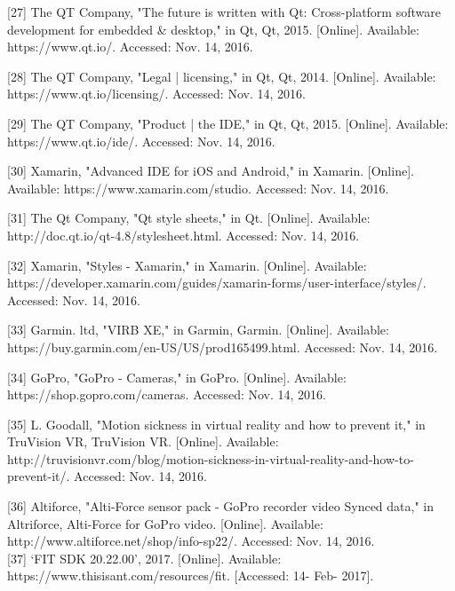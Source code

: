 \documentclass[10pt,draftclsnofoot,onecolumn]{IEEEtran}
\begin{document}
[27] The QT Company, "The future is written with Qt: Cross-platform software development for embedded & desktop," in Qt, Qt, 2015. [Online]. Available: https://www.qt.io/. Accessed: Nov. 14, 2016.\\
 \vspace{2mm}


[28] The QT Company, "Legal | licensing," in Qt, Qt, 2014. [Online]. Available: https://www.qt.io/licensing/. Accessed: Nov. 14, 2016.\\
 \vspace{2mm}


[29] The QT Company, "Product | the IDE," in Qt, Qt, 2015. [Online]. Available: https://www.qt.io/ide/. Accessed: Nov. 14, 2016.\\
 \vspace{2mm}


[30] Xamarin, "Advanced IDE for iOS and Android," in Xamarin. [Online]. Available: https://www.xamarin.com/studio. Accessed: Nov. 14, 2016.\\
 \vspace{2mm}


[31] The Qt Company, "Qt style sheets," in Qt. [Online]. Available: http://doc.qt.io/qt-4.8/stylesheet.html. Accessed: Nov. 14, 2016.\\
 \vspace{2mm}


[32] Xamarin, "Styles - Xamarin," in Xamarin. [Online]. Available: https://developer.xamarin.com/guides/xamarin-forms/user-interface/styles/. Accessed: Nov. 14, 2016.\\
 \vspace{2mm}


[33] Garmin. ltd, "VIRB XE," in Garmin, Garmin. [Online]. Available: https://buy.garmin.com/en-US/US/prod165499.html. Accessed: Nov. 14, 2016.\\
 \vspace{2mm}


[34] GoPro, "GoPro - Cameras," in GoPro. [Online]. Available: https://shop.gopro.com/cameras. Accessed: Nov. 14, 2016.\\
 \vspace{2mm}


[35] L. Goodall, "Motion sickness in virtual reality and how to prevent it," in TruVision VR, TruVision VR. [Online]. Available: http://truvisionvr.com/blog/motion-sickness-in-virtual-reality-and-how-to-prevent-it/. Accessed: Nov. 14, 2016.\\
 \vspace{2mm}


[36] Altiforce, "Alti-Force sensor pack - GoPro recorder video Synced data," in Altriforce, Alti-Force for GoPro video. [Online]. Available: http://www.altiforce.net/shop/info-sp22/. Accessed: Nov. 14, 2016.\\
 \vspace{2mm}
 [37] ‘FIT SDK 20.22.00’, 2017. [Online]. Available:
https://www.thisisant.com/resources/fit. [Accessed: 14- Feb- 2017].
\end{document}
